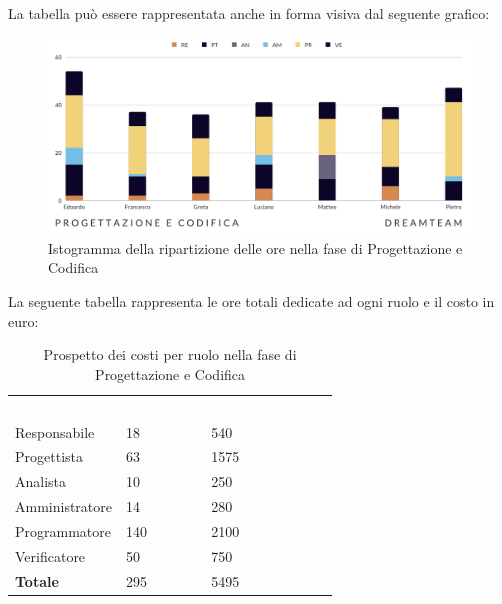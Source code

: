 La tabella può essere rappresentata anche in forma visiva dal seguente grafico:
\begin{figure}[H]
\centering
\includegraphics[scale=0.65]{Sezioni/SezioniPreventivo/grafici/Progettazione_codifica.png}
\caption{Istogramma della ripartizione delle ore nella fase di Progettazione e Codifica}
\end{figure}

La seguente tabella rappresenta le ore totali dedicate ad ogni ruolo e il costo in euro:

\begin{table}[H]
\begin{center}
\renewcommand{\arraystretch}{1.5}
\begin{tabular}{ m{}<{\centering}  m{}<{\centering} m{}<{\centering}}
	\rowcolor{darkblue}
	\textcolor{white}{\textbf{Ruolo}}&\textcolor{white}{\textbf{Totale ore}}&\textcolor{white}{\textbf{Costo totale (\euro)}}\\ 

	Responsabile  & 18 & 540 \\	
	
	Progettista & 63 & 1575 \\
	
	Analista & 10 & 250 \\

	Amministratore & 14 & 280 \\
	
	Programmatore & 140 & 2100 \\
	
	Verificatore & 50 & 750 \\
	
	\textbf{Totale} & 295 & 5495 \\
	
\end{tabular}
\caption{Prospetto dei costi per ruolo nella fase di Progettazione e Codifica}
\end{center}
\end{table}


